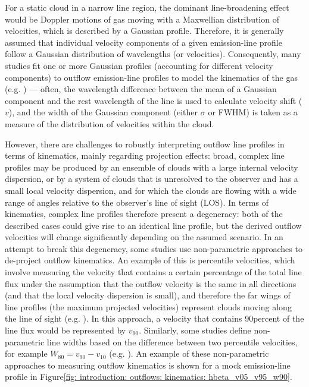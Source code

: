 For a static cloud in a narrow line region, the dominant line-broadening effect would be Doppler motions of gas moving with a Maxwellian distribution of velocities, which is described by a Gaussian profile. Therefore, it is generally assumed that individual velocity components of a given emission-line profile follow a Gaussian distribution of wavelengths (or velocities). Consequently, many studies fit one or more Gaussian profiles (accounting for different velocity components) to outflow emission-line profiles to model the kinematics of the gas (e.g. \citealt{VillarMartin1999, Crenshaw2000_N1068, Das2005, Holt2011, Mullaney2013, Rose2018, Tadhunter2019}) --- often, the wavelength difference between the mean of a Gaussian component and the rest wavelength of the line is used to calculate velocity shift ($v$), and the width of the Gaussian component (either $\sigma$ or FWHM) is taken as a measure of the distribution of velocities within the cloud.

However, there are challenges to robustly interpreting outflow line profiles in terms of kinematics, mainly regarding projection effects: broad, complex line profiles may be produced by an ensemble of clouds with a large internal velocity dispersion, or by a system of clouds that is unresolved to the observer and has a small local velocity dispersion, and for which the clouds are flowing with a wide range of angles relative to the observer's line of sight (LOS). In terms of kinematics, complex line profiles therefore present a degeneracy: both of the described cases could give rise to an identical line profile, but the derived outflow velocities will change significantly depending on the assumed scenario. In an attempt to break this degeneracy, some studies use non-parametric approaches to de-project outflow kinematics. An example of this is percentile velocities, which involve measuring the velocity that contains a certain percentage of the total line flux under the assumption that the outflow velocity is the same in all directions (and that the local velocity dispersion is small), and therefore the far wings of line profiles (the maximum projected velocities) represent clouds moving along the line of sight (e.g. \citealt{CanoDiaz2012, Harrison2014, Rose2018}). In this approach, a velocity that contains 90\;per\;cent of the line flux would be represented by $v_{90}$. Similarly, some studies define non-parametric line widths based on the difference between two percentile velocities, for example $W_{80}=v_{90}-v_{10}$ (e.g. \citealt{Harrison2014, Venturi2021}). An example of these non-parametric approaches to measuring outflow kinematics is shown for a mock emission-line profile in Figure\;\ref{fig: introduction: outflows: kinematics: hbeta_v05_v95_w90}.


